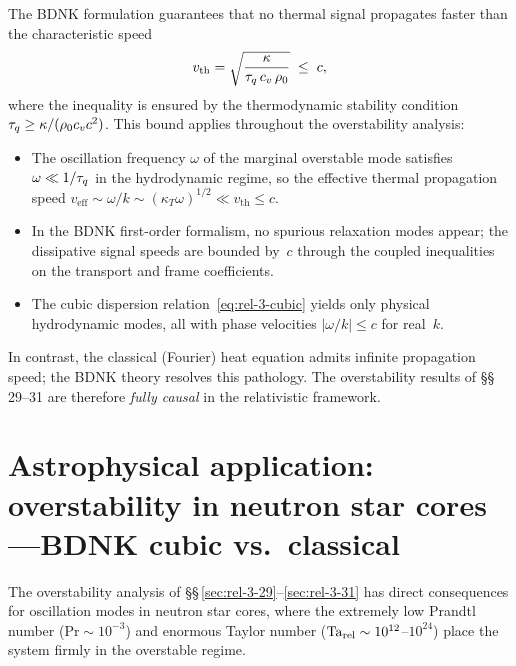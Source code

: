 \begin{causalitycheck}
The BDNK formulation guarantees that no thermal signal
propagates faster than the characteristic speed
\begin{equation}\label{eq:rel-3-vth}
  v_{\mathrm{th}}
  = \sqrt{\frac{\kappa}{\tau_{q}\,c_{v}\,\rho_0}}
  \;\le\; c,
\end{equation}
where the inequality is ensured by the thermodynamic stability
condition $\tau_{q} \ge \kappa/(\rho_0 c_{v} c^{2})$.  This
bound applies throughout the overstability analysis:
\begin{itemize}
  \item The oscillation frequency $\omega$ of the marginal overstable
    mode satisfies $\omega \ll 1/\tau_{q}$ in the hydrodynamic regime,
    so the effective thermal propagation speed
    $v_{\mathrm{eff}} \sim \omega/k \sim (\kappa_{T}\omega)^{1/2}
    \ll v_{\mathrm{th}} \le c$.
  \item In the BDNK first-order formalism, no spurious relaxation
    modes appear; the dissipative signal speeds are bounded by~$c$
    through the coupled inequalities on the transport and frame
    coefficients.
  \item The cubic dispersion relation~\eqref{eq:rel-3-cubic}
    yields only physical hydrodynamic modes, all with phase velocities
    $|\omega/k| \le c$ for real~$k$.
\end{itemize}
In contrast, the classical (Fourier) heat equation admits infinite
propagation speed; the BDNK theory resolves this pathology.
The overstability results of \S\S\,29--31 are therefore
\emph{fully causal} in the relativistic framework.
\end{causalitycheck}


\section{Astrophysical application: overstability in neutron star
cores---BDNK cubic vs.\ classical}\label{sec:rel-3-app-29-31}

The overstability analysis of \S\S\,\ref{sec:rel-3-29}--\ref{sec:rel-3-31}
has direct consequences for oscillation modes in neutron star cores,
where the extremely low Prandtl number ($\mathrm{Pr} \sim 10^{-3}$)
and enormous Taylor number ($\mathrm{Ta}_{\mathrm{rel}} \sim 10^{12}$--$10^{24}$)
place the system firmly in the overstable regime.

